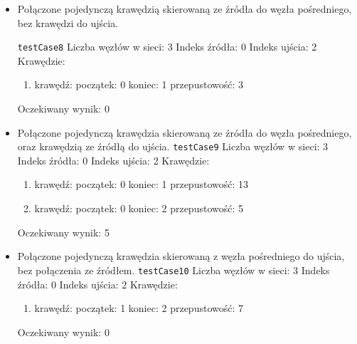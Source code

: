 \begin{itemize}[nosep]
    \item Połączone pojedynczą krawędzią skierowaną ze źródła do węzła
    pośredniego, bez krawędzi do ujścia.

    \texttt{testCase8}
    Liczba węzłów w sieci: 3
    Indeks źródła: 0
    Indeks ujścia: 2
    Krawędzie:
    \begin{enumerate}[nosep]
        \item krawędź:
        początek: 0
        koniec: 1
        przepustowość: 3
    \end{enumerate}
    Oczekiwany wynik: 0

    \item Połączone pojedynczą krawędzia skierowaną ze źródła do węzła
    pośredniego, oraz krawędzią ze źródłą do ujścia.
    \texttt{testCase9}
    Liczba węzłów w sieci: 3
    Indeks źródła: 0
    Indeks ujścia: 2
    Krawędzie:
    \begin{enumerate}[nosep]
        \item krawędź:
        początek: 0
        koniec: 1
        przepustowość: 13
        \item krawędź:
        początek: 0
        koniec: 2
        przepustowość: 5
    \end{enumerate}
    Oczekiwany wynik: 5

    \item Połączone pojedynczą krawędzia skierowaną z węzła pośredniego do
    ujścia, bez połączenia ze źródłem.
    \texttt{testCase10}
    Liczba węzłów w sieci: 3
    Indeks źródła: 0
    Indeks ujścia: 2
    Krawędzie:
    \begin{enumerate}[nosep]
        \item krawędź:
        początek: 1
        koniec: 2
        przepustowość: 7
    \end{enumerate}
    Oczekiwany wynik: 0
\end{itemize}


